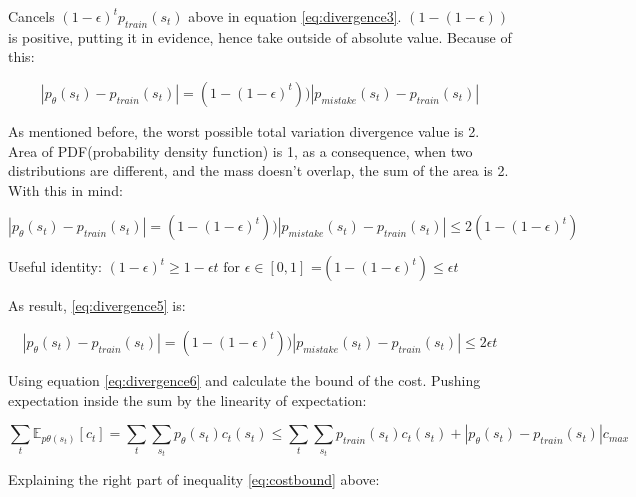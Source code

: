 \documentclass[]{article}
\begin{document}
\par Cancels $(1 - \epsilon)^{t}p_{train}(s_{t})$  above in equation \eqref{eq:divergence3}. $(1 -(1 - \epsilon))$ is
positive, putting it in evidence, hence take outside of absolute value. Because of this: 

\begin{equation}
    \label{eq:divergence4}
    |p_{\theta}(s_{t}) - p_{train}(s_{t})| = (1 - (1- \epsilon)^{t}))|p_{mistake}(s_{t}) - p_{train}(s_{t})|
\end{equation}

\par As mentioned before, the worst possible total variation divergence value is 2.  Area of PDF(probability density
function) is 1,  as a consequence, when two distributions are different, and the mass doesn't overlap, the sum
of the area is 2. With this in mind: 

\begin{equation}
    \label{eq:divergence5}
    |p_{\theta}(s_{t}) - p_{train}(s_{t})| = (1 - (1- \epsilon)^{t}))|p_{mistake}(s_{t}) - p_{train}(s_{t})| \leq
    2(1 - (1 - \epsilon)^{t})
\end{equation}

\par Useful identity: $(1 - \epsilon)^{t} \geq 1 - \epsilon t \text{ for } \epsilon \in [0,1]$ =$(1 - (1 -
\epsilon)^{t}) \leq \epsilon t$

\par As result, \eqref{eq:divergence5} is:

\begin{equation}
    \label{eq:divergence6}
    |p_{\theta}(s_{t}) - p_{train}(s_{t})| = (1 - (1- \epsilon)^{t}))|p_{mistake}(s_{t}) - p_{train}(s_{t})| \leq
    2\epsilon t
\end{equation}

\par Using equation \eqref{eq:divergence6}  and calculate the bound of the cost.  Pushing expectation inside the
sum by the linearity of expectation: 

\begin{equation}
    \label{eq:costbound}
        \sum_{t}\mathbb{E}_{p\theta(s_{t})}[c_{t}] = \sum_{t} \sum_{s_{t}} p_{\theta}(s_{t})c_{t}(s_{t}) \leq
    \sum_{t}\sum_{s_{t}} p_{train}(s_{t})c_{t}(s_{t}) + |p_{\theta}(s_{t}) - p_{train}(s_{t})|c_{max}
\end{equation}

\par Explaining the right part of inequality \eqref{eq:costbound} above:
\end{document}
